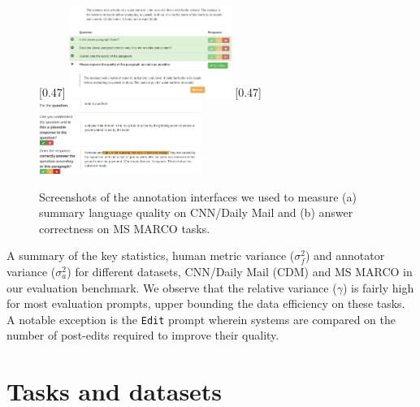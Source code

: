 \begin{figure}[t]
  \centering
  [0.47\linewidth]{%
    \includegraphics[width=0.47\textwidth]{figures/edit.png}
  }\hfill
  [0.47\linewidth]{%
    \includegraphics[width=0.47\textwidth]{figures/qa.png}
  }
  \caption[Annotation interfaces]{\label{fig:tasks} Screenshots of the annotation interfaces we used to measure (a) summary language quality on CNN/Daily Mail and (b) answer correctness on MS MARCO tasks.
  }
\end{figure}

\begin{table}[t]
  \centering
  
  \caption[Key statistics of the data collected]{\label{tab:dataset} A summary of the key statistics, human metric variance ($\sigma^2_f$) and annotator variance ($\sigma^2_a$) for different datasets, CNN/Daily Mail (CDM) and MS MARCO in our evaluation benchmark.
  We observe that the relative variance ($\gamma$) is fairly high for most evaluation prompts, upper bounding the data efficiency on these tasks.
  A notable exception is the \texttt{Edit} prompt wherein systems are compared on the number of post-edits required to improve their quality.
  }
\end{table}

\section{\label{sec:tasks} Tasks and datasets}

